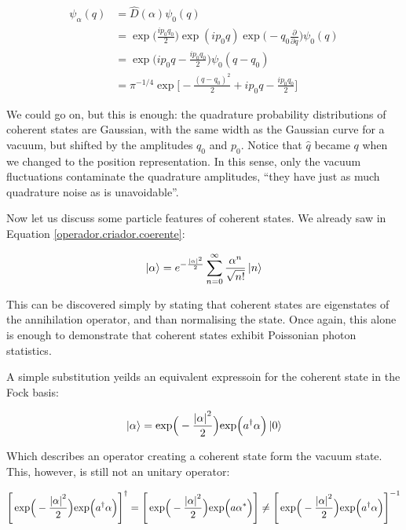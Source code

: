 \documentclass[12pt,a4paper]{report}
\begin{document}
\begin{align*}
    \psi_{\alpha}(q)&=\hat D(\alpha)\psi_0(q)\\
                    &= \exp\Big(\frac{ip_0q_0}{2}\Big)\exp(ip_0 q)\exp\Big(-q_0\frac{\partial}{\partial q}\Big)\psi_0(q)\\
                    &=\exp\Big(ip_0q-\frac{ip_0q_0}{2}\Big)\psi_0(q-q_0)\\
                    &=\pi^{-1/4}\exp\Big[-\frac{(q-q_0)^2}{2}+ip_0q-\frac{ip_0q_0}{2}\Big]
\end{align*}

We could go on, but this is enough: the quadrature probability distributions of coherent states are Gaussian, with the same width as the Gaussian curve for a vacuum, but shifted by the amplitudes $q_0$ and $p_0$. Notice that $\hat q$ became $q$ when we changed to the position representation. In this sense, only the vacuum fluctuations contaminate the quadrature amplitudes, ``they have just as much quadrature noise as is unavoidable''.

Now let us discuss some particle features of coherent states. We already saw in Equation \ref{operador.criador.coerente}:

\begin{equation}
   \ket{\alpha}=e^{-\frac{\abs{\alpha}^2}{2}}\sum_{n=0}^{\infty}\frac{\alpha^n}{\sqrt{n!}}\ket{n}
\end{equation}

This can be discovered simply by stating that coherent states are eigenstates of the annihilation operator, and than normalising the state. Once again, this alone is enough to demonstrate that coherent states exhibit Poissonian photon statistics.

A simple substitution yeilds an equivalent expressoin for the coherent state in the Fock basis:

\begin{equation}
   \ket{\alpha}=\exp\Bigr(-\frac{\abs{\alpha}^2}{2}\Bigl)\exp\Bigl(a^{\dag}\alpha\Bigr)\ket{0}
\end{equation}

Which describes an operator creating a coherent state form the vacuum state. This, however, is still not an unitary operator:

\begin{equation*}
    \Bigg[\exp\Bigr(-\frac{\abs{\alpha}^2}{2}\Bigl)\exp\Bigl(a^{\dag}\alpha\Bigr)\Bigg]^{\dag}=\Bigg[\exp\Bigr(-\frac{\abs{\alpha}^2}{2}\Bigl)\exp\Bigl(a\alpha^*\Bigr)\Bigg]\neq\Bigg[\exp\Bigr(-\frac{\abs{\alpha}^2}{2}\Bigl)\exp\Bigl(a^{\dag}\alpha\Bigr)\Bigg]^{-1}
\end{equation*}
\end{document}
